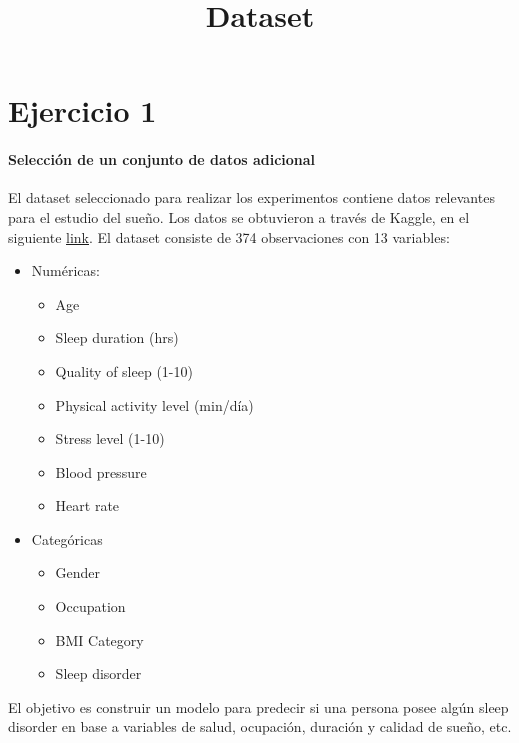 \documentclass[
]{article}
\title{Dataset}
\author{}
\date{\vspace{-2.5em}}
\begin{document}
\maketitle

\hypertarget{ejercicio-1}{%
\section{Ejercicio 1}\label{ejercicio-1}}

\hypertarget{selecciuxf3n-de-un-conjunto-de-datos-adicional}{%
\paragraph{Selección de un conjunto de datos
adicional}\label{selecciuxf3n-de-un-conjunto-de-datos-adicional}}

El dataset seleccionado para realizar los experimentos contiene datos
relevantes para el estudio del sueño. Los datos se obtuvieron a través
de Kaggle, en el siguiente
\href{https://www.kaggle.com/datasets/uom190346a/sleep-health-and-lifestyle-dataset}{link}.
El dataset consiste de 374 observaciones con 13 variables:

\begin{itemize}
\item
  Numéricas:

  \begin{itemize}
  \item
    Age
  \item
    Sleep duration (hrs)
  \item
    Quality of sleep (1-10)
  \item
    Physical activity level (min/día)
  \item
    Stress level (1-10)
  \item
    Blood pressure
  \item
    Heart rate
  \end{itemize}
\item
  Categóricas

  \begin{itemize}
  \item
    Gender
  \item
    Occupation
  \item
    BMI Category
  \item
    Sleep disorder
  \end{itemize}
\end{itemize}

El objetivo es construir un modelo para predecir si una persona posee
algún sleep disorder en base a variables de salud, ocupación, duración y
calidad de sueño, etc.
\end{document}
